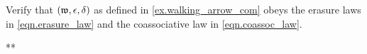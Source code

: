 \documentclass[Book-Poly]{subfiles}
\begin{document}
\begin{exercise} \label{exc.walking_arrow_com}
Verify that $(\mathfrak{w},\epsilon,\delta)$ as defined in \cref{ex.walking_arrow_com} obeys the erasure laws in \eqref{eqn.erasure_law} and the coassociative law in \eqref{eqn.coassoc_law}.
\begin{solution}
** %

\end{solution}
\end{exercise}
\end{document}
